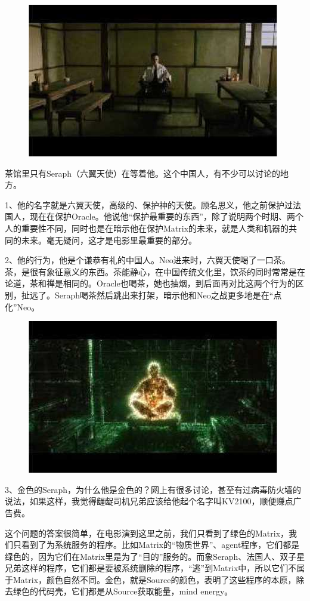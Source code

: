 \documentclass[UTF8]{ctexart}
\begin{document}
\begin{figure}[htb]
\centering
\includegraphics[width=0.5\linewidth]{fig/read_reloaded-58}
\end{figure}

茶馆里只有Seraph（六翼天使）在等着他。这个中国人，有不少可以讨论的地方。

1、他的名字就是六翼天使，高级的、保护神的天使。顾名思义，他之前保护过法国人，现在在保护Oracle。他说他“保护最重要的东西”，除了说明两个时期、两个人的重要性不同，同时也是在暗示他在保护Matrix的未来，就是人类和机器的共同的未来。毫无疑问，这才是电影里最重要的部分。

2、他的行为，他是个谦恭有礼的中国人。Neo进来时，六翼天使喝了一口茶。茶，是很有象征意义的东西。茶能静心，在中国传统文化里，饮茶的同时常常是在论道，茶和禅是相同的。Oracle也喝茶，她也抽烟，到后面再对比这两个行为的区别，扯远了。Seraph喝茶然后跳出来打架，暗示他和Neo之战更多地是在“点化”Neo。

\begin{figure}[htb]
\centering
\includegraphics[width=0.5\linewidth]{fig/read_reloaded-59}
\end{figure}

3、金色的Seraph，为什么他是金色的？网上有很多讨论，甚至有过病毒防火墙的说法，如果这样，我觉得龌龊司机兄弟应该给他起个名字叫KV2100，顺便赚点广告费。

这个问题的答案很简单，在电影演到这里之前，我们只看到了绿色的Matrix，我们只看到了为系统服务的程序。比如Matrix的“物质世界”、agent程序，它们都是绿色的，因为它们在Matrix里是为了“目的”服务的。而象Seraph、法国人、双子星兄弟这样的程序，它们都是要被系统删除的程序，“逃”到Matrix中，所以它们不属于Matrix，颜色自然不同。金色，就是Source的颜色，表明了这些程序的本原，除去绿色的代码壳，它们都是从Source获取能量，mind energy。
\end{document}
